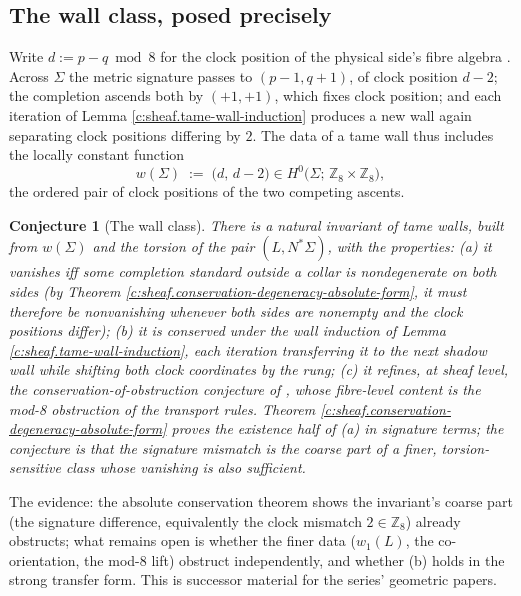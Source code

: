\documentclass[11pt]{article}
\newtheorem{conjecture}[theorem]{Conjecture}
\theoremstyle{definition}
\theoremstyle{plain}
\providecommand{\Sig}{}\renewcommand{\Sig}{\Sigma}
\providecommand{\shL}{}\renewcommand{\shL}{L}
\begin{document}
\subsection*{The wall class, posed precisely}
\label{c:note.sheaf.setting-wall-class-posed-precisely}
Write $d := p - q \bmod 8$ for the clock position of the physical side's fibre algebra \cite[\S7]{ButlerT1}. Across $\Sig$ the metric signature passes to $(p{-}1, q{+}1)$, of clock position $d - 2$; the completion ascends both by $(+1,+1)$, which fixes clock position; and each iteration of Lemma \ref{c:sheaf.tame-wall-induction} produces a new wall again separating clock positions differing by $2$. The data of a tame wall thus includes the locally constant function
\[
w(\Sig) \;:=\; \bigl(d,\, d-2\bigr) \in H^0\bigl(\Sig;\, \mathbb{Z}_8 \times \mathbb{Z}_8\bigr),
\]
the ordered pair of clock positions of the two competing ascents.

\begin{conjecture}[The wall class]\label{c:sheaf.wall-class}
There is a natural invariant of tame walls, built from $w(\Sig)$ and the torsion of the pair $(\shL, N^*\Sig)$, with the properties: (a) it vanishes iff some completion standard outside a collar is nondegenerate on \emph{both} sides (by Theorem \ref{c:sheaf.conservation-degeneracy-absolute-form}, it must therefore be nonvanishing whenever both sides are nonempty and the clock positions differ); (b) it is conserved under the wall induction of Lemma \ref{c:sheaf.tame-wall-induction}, each iteration transferring it to the next shadow wall while shifting both clock coordinates by the rung; (c) it refines, at sheaf level, the conservation-of-obstruction conjecture of \cite[Conj.~7.9]{ButlerT1}, whose fibre-level content is the mod-8 obstruction of the transport rules. Theorem \ref{c:sheaf.conservation-degeneracy-absolute-form} proves the existence half of (a) in signature terms; the conjecture is that the signature mismatch is the coarse part of a finer, torsion-sensitive class whose vanishing is also sufficient.
\end{conjecture}

\label{c:note.sheaf.setting-wall-class-posed-precisely-2}
The evidence: the absolute conservation theorem shows the invariant's coarse part (the signature difference, equivalently the clock mismatch $2 \in \mathbb{Z}_8$) already obstructs; what remains open is whether the finer data ($w_1(\shL)$, the co-orientation, the mod-8 lift) obstruct independently, and whether (b) holds in the strong transfer form. This is successor material for the series' geometric papers.
\end{document}
